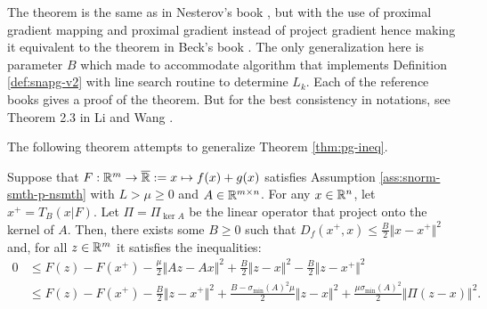\documentclass[12pt]{article}
\begin{document}
            \begin{remark}
                The theorem is the same as in Nesterov's book \cite[Theorem 2.2.13]{nesterov_lectures_2018}, but with the use of proximal gradient mapping and proximal gradient instead of project gradient hence making it equivalent to the theorem in Beck's book \cite[Theorem 10.16]{beck_first-order_2017}. 
                The only generalization here is parameter $B$ which made to accommodate algorithm that implements Definition \ref{def:snapg-v2} with line search routine to determine $L_k$. 
                Each of the reference books gives a proof of the theorem. 
                But for the best consistency in notations, see Theorem 2.3 in Li and Wang \cite{li_relaxed_2025}. 
            \end{remark}
            The following theorem attempts to generalize Theorem \ref{thm:pg-ineq}. 
            \begin{theorem}\label{thm:pg-ineq-semi-scnvx}
                Suppose that $F:\mathbb R^m \rightarrow \overline {\mathbb R} := x \mapsto f(x) + g(x)$ satisfies Assumption \ref{ass:snorm-smth-p-nsmth} with $L > \mu \ge 0$ and $A \in \mathbb R^{m\times n}$. 
                For any $x \in \mathbb R^n$, let $x^+ = T_B(x | F)$. 
                Let $\Pi = \Pi_{\ker A}$ be the linear operator that project onto the kernel of $A$. 
                Then, there exists some $B \ge 0$ such that $D_f(x^+, x) \le \frac{B}{2}\Vert x - x^+\Vert^2$ and, for all $z \in \mathbb R^m$ it satisfies the inequalities: 
                \begin{align*}
                    0 &\le F(z) - F(x^+) 
                    - \frac{\mu}{2}\Vert Az - Ax\Vert^2 
                    + \frac{B}{2}\Vert z - x\Vert^2
                    - \frac{B}{2}\Vert z - x^+\Vert^2
                    \\
                    &\le F(z) - F(x^+) 
                    - \frac{B}{2}\Vert z - x^+\Vert^2
                    + \frac{B - \sigma_{\min}(A)^2\mu}{2}\Vert z - x\Vert^2
                    + \frac{\mu\sigma_{\min}(A)^2}{2}\Vert \Pi(z - x)\Vert^2. 
                \end{align*}
            \end{theorem}
\end{document}
